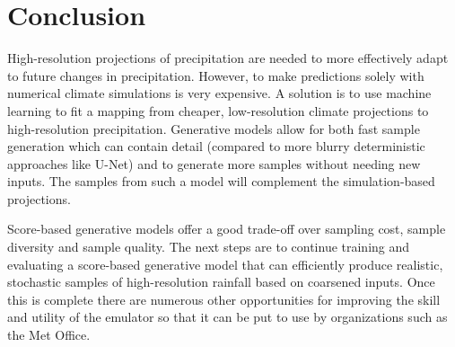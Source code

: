 \section{Conclusion} \label{sec:conclusion}

High-resolution projections of precipitation are needed to more effectively adapt to future changes in precipitation. However, to make predictions solely with numerical climate simulations is very expensive. A solution is to use machine learning to fit a mapping from cheaper, low-resolution climate projections to high-resolution precipitation. Generative models allow for both fast sample generation which can contain detail (compared to more blurry deterministic approaches like U-Net) and to generate more samples without needing new inputs. The samples from such a model will complement the simulation-based projections.

Score-based generative models offer a good trade-off over sampling cost, sample diversity and sample quality. The next steps are to continue training and evaluating a score-based generative model that can efficiently produce realistic, stochastic samples of high-resolution rainfall based on coarsened inputs. Once this is complete there are numerous other opportunities for improving the skill and utility of the emulator so that it can be put to use by organizations such as the Met Office.
